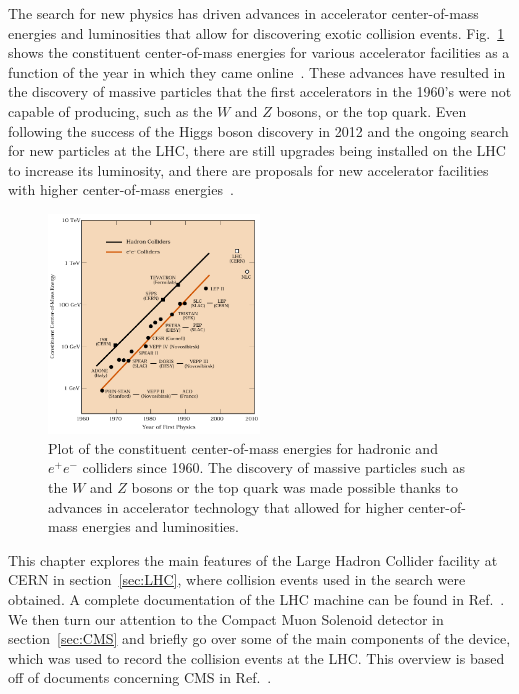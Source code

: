 The search for new physics has driven advances in accelerator center-of-mass energies and luminosities that allow for discovering exotic collision events.
Fig.~\ref{fig:ECMplot} shows the constituent center-of-mass energies for various accelerator facilities as a function of the year in which they came online~\cite{Panofsky}.
These advances have resulted in the discovery of massive particles that the first accelerators in the 1960's were not capable of producing, such as the $W$ and $Z$ bosons, or the top quark. %
Even following the success of the Higgs boson discovery in 2012 and the ongoing search for new particles at the LHC, there are still upgrades being installed on the LHC to increase its luminosity, and there are proposals for new accelerator facilities with higher center-of-mass energies~\cite{Bicer_2014}.

\begin{figure}[htbp]
  \centering
  \includegraphics[width=0.5\textwidth]{fig/experiment/ecm_livingston.pdf}
  \caption{Plot of the constituent center-of-mass energies for hadronic and $e^+e^-$ colliders since 1960. The discovery of massive particles such as the $W$ and $Z$ bosons or the top quark was made possible thanks to advances in accelerator technology that allowed for higher center-of-mass energies and luminosities.}
  \label{fig:ECMplot}
\end{figure}

This chapter explores the main features of the Large Hadron Collider facility at CERN in section~\ref{sec:LHC}, where collision events used in the search were obtained.
A complete documentation of the LHC machine can be found in Ref.~\cite{Evans:1129806}.
We then turn our attention to the Compact Muon Solenoid detector in section~\ref{sec:CMS} and briefly go over some of the main components of the device, which was used to record the collision events at the LHC.
This overview is based off of documents concerning CMS in Ref.~\cite{Chatrchyan:1129810}.


